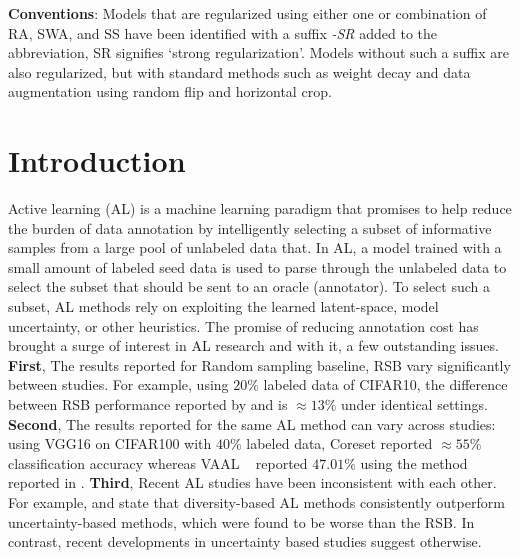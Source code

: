 \documentclass[10pt,twocolumn,letterpaper]{article}
\begin{document}
\hspace{-6.4mm}\textbf{Conventions}: Models that are regularized using either one or combination of RA, SWA, and SS have been identified with a suffix \textit{-SR} added to the abbreviation, SR signifies `strong regularization'. Models without such a suffix are also regularized, but with standard methods such as weight decay and data augmentation using random flip and horizontal crop.

\section{Introduction}
\label{sec:intro}

Active learning (AL) is a machine learning paradigm that promises to help reduce the burden of data annotation by intelligently selecting a subset of informative samples from a large pool of unlabeled data that. In AL, a model trained with a small amount of labeled seed data is used to parse through the unlabeled data to select the subset that should be sent to an oracle (annotator). To select such a subset, AL methods rely on exploiting the learned latent-space, model uncertainty, or other heuristics. The promise of reducing annotation cost has brought a surge of interest in AL research \cite{VAAL_sinha2019variational, coreset_sener2018active, Ensembles_Beluch2018ThePO, DBAL_gal2017deep,BatchBald_DBLP:journals/corr/abs-1906-08158, BGALD_DBLP:journals/corr/abs-1904-11643,yoo2019learning_loss_for_AL,coregcn_caramalau2021sequential, tavaal_kim2021task} and with it, a few outstanding issues.
\textbf{First}, The results reported for Random sampling baseline, RSB vary significantly between studies. For example, using $20\%$ labeled data of CIFAR10, the difference between RSB performance reported by \cite{yoo2019learning_loss_for_AL} and \cite{BGALD_DBLP:journals/corr/abs-1904-11643} is $\approx 13\%$ under identical settings. 
\textbf{Second}, 
The results reported for the same AL method can vary across studies: using VGG16 \cite{vgg16_simonyan2014very} on CIFAR100 \cite{cifar10_dataset_krizhevsky2009learning} with $40\%$ labeled data, Coreset \cite{coreset_sener2018active} reported $\approx 55\%$ classification accuracy whereas VAAL ~\cite{VAAL_sinha2019variational} reported $47.01\%$ using the method reported in \cite{coreset_sener2018active}. 
\textbf{Third}, Recent AL studies have been inconsistent with each other. For example, \cite{coreset_sener2018active} and \cite{Adv_AL_DBLP:journals/corr/abs-1802-09841} state that diversity-based AL methods consistently outperform uncertainty-based methods, which were found to be worse than the RSB. In contrast, recent developments in uncertainty based studies \cite{yoo2019learning_loss_for_AL} suggest otherwise.
\end{document}
